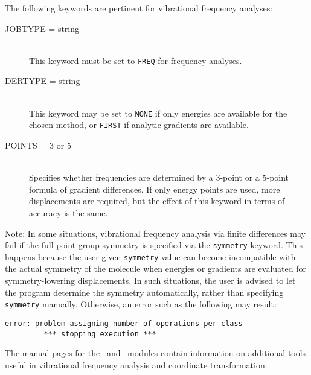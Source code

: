 The following keywords are pertinent for vibrational frequency analyses:
\begin{description}
\item[JOBTYPE = string]\mbox{}\\
This keyword must be set to {\tt FREQ} for frequency analyses.
\item[DERTYPE = string]\mbox{}\\
This keyword may be set to {\tt NONE} if only energies are available
for the chosen method, or {\tt FIRST} if analytic gradients are available.
\item[POINTS = 3 or 5]\mbox{}\\
Specifies whether frequencies are determined by a 3-point or a 5-point
formula of gradient differences.  If only energy points are used, more
displacements are required, but the effect of this keyword in terms of
accuracy is the same.
\end{description}

\begin{em}
Note: In some situations, vibrational frequency analysis via finite
differences may fail if the full point group symmetry is specified via
the {\tt symmetry} keyword.  This happens because the user-given
{\tt symmetry} value can become incompatible with the actual symmetry
of the molecule when energies or gradients are evaluated for
symmetry-lowering displacements.  In such situations, the user is
advised to let the program determine the symmetry automatically, rather
than specifying {\tt symmetry} manually.  Otherwise, an error such as the
following may result:
\end{em}

\begin{verbatim}
error: problem assigning number of operations per class
         *** stopping execution ***
\end{verbatim}

The manual pages for the \PSInormco\ and \PSIintder\ modules contain
information on additional tools useful in vibrational frequency analysis
and coordinate transformation.

